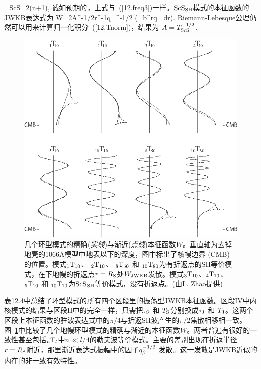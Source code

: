 \eq
\omega\tau_{\rm ScS}=2\pi(n+1),
\label{12.newfreq3}
\en
诚如预期的，上式与~(\ref{12.freq3})一样。${\rm ScS}_{\rm SH}$模式的本征函数的JWKB表达式为
\eq
W=2A\mu^{-1/2}r^{-1}q_{\beta}^{-1/2}
\cos\left(\omega\int_b^rq_{\beta}\,dr\right).
\en
Riemann-Lebesque公理仍然可以用来计算归一化积分~(\ref{12.Tnorm})，结果为
$A=T_{\rm ScS}^{-1/2}$.\vspace{-0.5mm}
\begin{figure}[!t]
\begin{center}
\includegraphics{../figures/chap12/fig18.eps}
\end{center}
\caption[W Comparison]{\label{12.fig.Wplot}
几个环型模式的精确({\em 实线\/})与渐近({\em 点线\/})本征函数$W$。垂直轴为去掉地壳的1066A模型中地表以下的深度，图中标出了核幔边界 (CMB) 的位置。模式${}_1{\rm T}_{10}$、 ${}_2{\rm T}_{10}$、
${}_8{\rm T}_{50}$ 和 ${}_{10}{\rm T}_{80}$为有折返点的SH等价模式，在下地幔的折返点$r=R_{\rm S}$处$W_{\rm JWKB}$发散。模式${}_3{\rm T}_{10}$、${}_4{\rm T}_{10}$、
${}_5{\rm T}_{10}$ 和 ${}_{10}{\rm T}_{10}$为${\rm ScS}_{\rm SH}$等价模式，没有折返点。(由L. Zhao提供)
}
\end{figure}

表12.4中总结了环型模式的所有四个区段里的振荡型JWKB本征函数。区段IV中内核模式的结果与区段II中的完全一样，只需把$\tau_{\rm S}$
和 $T_{\rm S}$分别换成$\tau_{\rm J}$
和 $T_{\rm J}$。这两个区段上本征函数的驻波表达式中的$\pi/4$与折返SH波产生的$\pi/2$焦散相移相一致。图~\ref{12.fig.Wplot}中比较了几个地幔环型模式的精确与渐近的本征函数$W$。两者普遍有很好的一致性甚至包括${}_n{\rm T}_l$中$n\ll l/4$的勒夫波等价模式。主要的差别出现在折返半径$r=R_{\rm S}$附近，那里渐近表达式振幅中的因子$q_{\beta}^{\raise-.8ex\hbox{$\scriptstyle -1/2$}}$ 发散。这一发散是JWKB近似的内在的非一致有效特性。

